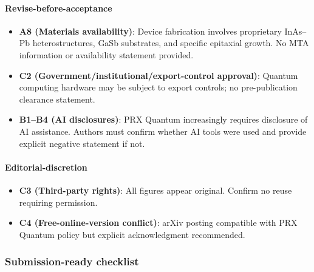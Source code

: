 \documentclass[10pt,letterpaper]{article}
\providecommand{\tightlist}{\setlength{\itemsep}{0pt}\setlength{\parskip}{0pt}}
\begin{document}
\hypertarget{revise-before-acceptance}{%
\paragraph{Revise-before-acceptance}\label{revise-before-acceptance}}

\begin{itemize}
\tightlist
\item
  \textbf{A8 (Materials availability)}: Device fabrication involves proprietary InAs--Pb heterostructures, GaSb substrates, and specific epitaxial growth. No MTA information or availability statement provided.
\item
  \textbf{C2 (Government/institutional/export-control approval)}: Quantum computing hardware may be subject to export controls; no pre-publication clearance statement.
\item
  \textbf{B1--B4 (AI disclosures)}: PRX Quantum increasingly requires disclosure of AI assistance. Authors must confirm whether AI tools were used and provide explicit negative statement if not.
\end{itemize}

\hypertarget{editorial-discretion}{%
\paragraph{Editorial-discretion}\label{editorial-discretion}}

\begin{itemize}
\tightlist
\item
  \textbf{C3 (Third-party rights)}: All figures appear original. Confirm no reuse requiring permission.
\item
  \textbf{C4 (Free-online-version conflict)}: arXiv posting compatible with PRX Quantum policy but explicit acknowledgment recommended.
\end{itemize}

\hypertarget{submission-ready-checklist}{%
\subsubsection{Submission-ready checklist}\label{submission-ready-checklist}}
\end{document}
